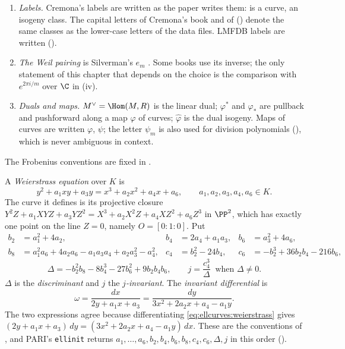 \begin{convention}
\begin{enumerate}[label=(\alph*)]
$\bar\chi_3=\chi_{-3}$. For an integer $m$ prime to $\operatorname{char}K$, $\chi_m^{\mathrm{cyc}}\colon G_K\to(\Z/m)^\times$ is defined by
$\sigma(\zeta)=\zeta^{\chi_m^{\mathrm{cyc}}(\sigma)}$ for $\zeta\in\mu_m$.
\item \emph{Labels.} Cremona's labels are written as the paper writes them:  is a curve,  an isogeny class. The
capital letters of Cremona's book and of \cite{ARS12} () denote the same classes as the lower-case letters of the data files.
LMFDB labels are written  ().
\item \emph{The Weil pairing} is Silverman's $e_m$ \cite[Section III.8]{SilvermanAEC}. Some books use its inverse; the only
statement of this chapter that depends on the choice is the comparison with $e^{2\pi i/m}$ over $\C$ in
(iv).
\item \emph{Duals and maps.} $M^\vee=\Hom(M,R)$ is the linear dual; $\varphi^*$ and $\varphi_*$ are pullback and pushforward along a
map $\varphi$ of curves; $\hat\varphi$ is the dual isogeny. Maps of curves are written $\varphi$, $\psi$; the letter $\psi_m$ is also used
for division polynomials (), which is never ambiguous in context.
\end{enumerate}
The Frobenius conventions are fixed in .
\end{convention}

\begin{definition}\label{def:ellcurves:weierstrass}
A \emph{Weierstrass equation} over $K$ is
\begin{equation}\label{eq:ellcurves:weierstrass}
y^2+a_1xy+a_3y=x^3+a_2x^2+a_4x+a_6,\qquad a_1,a_2,a_3,a_4,a_6\in K .
\end{equation}
The curve it defines is its projective closure $Y^2Z+a_1XYZ+a_3YZ^2=X^3+a_2X^2Z+a_4XZ^2+a_6Z^3$ in $\PP^2$, which has exactly one point
on the line $Z=0$, namely $O=[0:1:0]$. Put
\begin{align*}
b_2&=a_1^2+4a_2, & b_4&=2a_4+a_1a_3, & b_6&=a_3^2+4a_6,\\
b_8&=a_1^2a_6+4a_2a_6-a_1a_3a_4+a_2a_3^2-a_4^2, & c_4&=b_2^2-24b_4, & c_6&=-b_2^3+36b_2b_4-216b_6,
\end{align*}
\[
\Delta=-b_2^2b_8-8b_4^3-27b_6^2+9b_2b_4b_6,\qquad j=\frac{c_4^3}{\Delta}\ \text{ when }\Delta\ne0 .
\]
$\Delta$ is the \emph{discriminant} and $j$ the \emph{$j$-invariant}. The \emph{invariant differential} is
\[
\omega=\frac{dx}{2y+a_1x+a_3}=\frac{dy}{3x^2+2a_2x+a_4-a_1y}.
\]
The two expressions agree because differentiating \eqref{eq:ellcurves:weierstrass} gives
$(2y+a_1x+a_3)\,dy=(3x^2+2a_2x+a_4-a_1y)\,dx$. These are the conventions of \cite[Section III.1]{SilvermanAEC}, and PARI's
\texttt{ellinit} returns $a_1,\dots,a_6,b_2,b_4,b_6,b_8,c_4,c_6,\Delta,j$ in this order ().
\end{definition}

